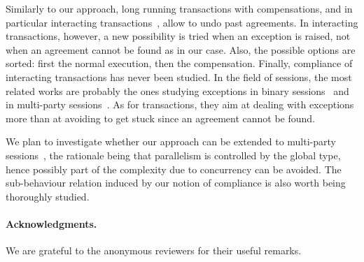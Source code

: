 \documentclass[UKenglish]{eptcs}
\begin{document}
Similarly to our approach, long running transactions with
compensations, and in particular interacting
transactions~\cite{VriesKH10}, allow to undo past agreements. In
interacting transactions, however, a new possibility is tried when an
exception is raised, not when an agreement cannot be found as in our
case. Also, the possible options are sorted: first the normal
execution, then the compensation.  Finally, compliance of interacting
transactions has never been studied. In the field of sessions, the
most related works are probably the ones studying exceptions in binary
sessions~\cite{CarboneHY08} and in multi-party
sessions~\cite{CapecchiGY10}. As for transactions, they aim at dealing
with exceptions more than at avoiding to get stuck since an agreement
cannot be found.

We plan to investigate whether our approach can be extended to
multi-party sessions~\cite{HYC08}, the rationale being that parallelism
is controlled by the global type, hence possibly part of the
complexity due to concurrency can be avoided. The sub-behaviour
relation induced by our notion of compliance is also worth being
thoroughly studied.


\paragraph{Acknowledgments.} 
We are grateful to the anonymous reviewers for their useful remarks.
\label{sect:bib}


\end{document}

